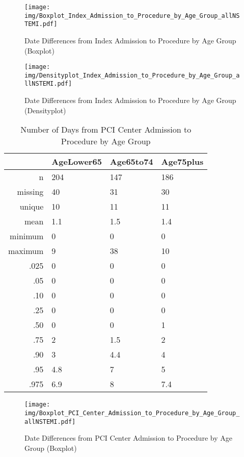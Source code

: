 \documentclass[a4paper]{report}
\begin{document}
\begin{itemize}
{\begin{figure}
  \centering
  \caption{Date Differences from Index Admission to Procedure by Age Group (Boxplot)}
  \label{Boxplot: Date Differences from Index Admission to Procedure by Age Group}
\texttt{[image: img/Boxplot\_Index\_Admission\_to\_Procedure\_by\_Age\_Group\_allNSTEMI.pdf]}\end{figure}


\begin{figure}
  \centering
  \caption{Date Differences from Index Admission to Procedure by Age Group (Densityplot)}
  \label{Density: Date Differences from Index Admission to Procedure by Age Group}
\texttt{[image: img/Densityplot\_Index\_Admission\_to\_Procedure\_by\_Age\_Group\_allNSTEMI.pdf]}\end{figure}



\clearpage

\begin{table}[ht]
\centering
\begin{tabular}{rlll}
  \toprule
 & AgeLower65 & Age65to74 & Age75plus \\ 
  \midrule
n & 204 & 147 & 186 \\ 
  missing & 40 & 31 & 30 \\ 
  unique & 10 & 11 & 11 \\ 
  mean & 1.1 & 1.5 & 1.4 \\ 
  minimum & 0 & 0 & 0 \\ 
  maximum & 9 & 38 & 10 \\ 
  .025 & 0 & 0 & 0 \\ 
  .05 & 0 & 0 & 0 \\ 
  .10 & 0 & 0 & 0 \\ 
  .25 & 0 & 0 & 0 \\ 
  .50 & 0 & 0 & 1 \\ 
  .75 & 2 & 1.5 & 2 \\ 
  .90 & 3 & 4.4 & 4 \\ 
  .95 & 4.8 & 7 & 5 \\ 
  .975 & 6.9 & 8 & 7.4 \\ 
   \bottomrule
\end{tabular}
\caption{Number of Days from PCI Center Admission to Procedure by Age Group} 
\end{table}
\begin{figure}
  \centering
  \caption{Date Differences from PCI Center Admission to Procedure by Age Group (Boxplot)}
  \label{Boxplot: Date Differences from PCI Center Admission to Procedure by Age Group}
\texttt{[image: img/Boxplot\_PCI\_Center\_Admission\_to\_Procedure\_by\_Age\_Group\_allNSTEMI.pdf]}\end{figure}


}
\end{itemize}
\end{document}
